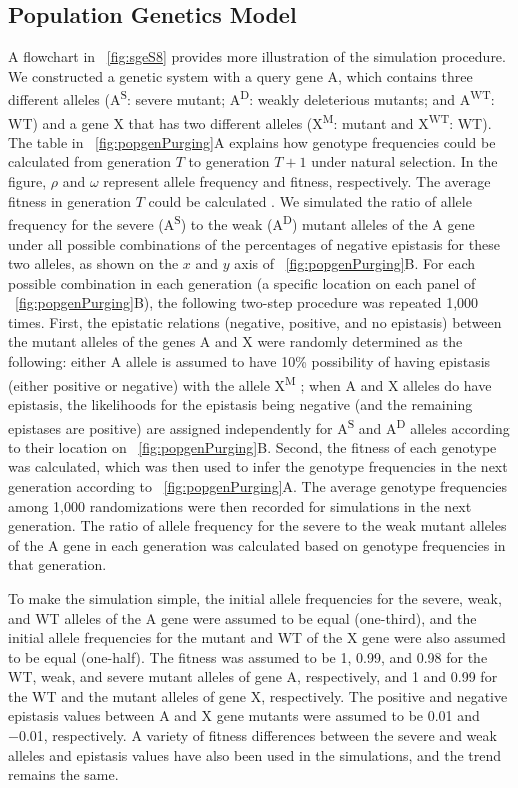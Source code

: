 \subsection{Population Genetics Model} A flowchart in
\Fig~\ref{fig:sgeS8} provides more illustration of the simulation
procedure. We constructed a
genetic system with a query gene A, which contains three different
alleles (A\textsuperscript{S}: severe mutant; A\textsuperscript{D}:
weakly deleterious mutants; and A\textsuperscript{WT}: WT) and a gene
X that has two different alleles (X\textsuperscript{M}: mutant and
X\textsuperscript{WT}: WT). The table in \Fig~\ref{fig:popgenPurging}A
explains how genotype
frequencies could be calculated from generation $T$ to generation
$T+1$ under natural selection. In the figure, $\rho$ and $\omega$
represent allele frequency and fitness, respectively. The average
fitness in generation $T$ could be calculated \citep{Hartl2007}.  We
simulated the ratio of allele frequency for the severe
(A\textsuperscript{S}) to the weak (A\textsuperscript{D}) mutant
alleles of the A gene under all possible combinations of the
percentages of negative epistasis for these two alleles, as shown on
the $x$ and $y$ axis of \Fig~\ref{fig:popgenPurging}B. For each
possible combination in each generation (a specific location on each
panel of \Fig~\ref{fig:popgenPurging}B), the following two-step
procedure was repeated 1,000
times. First, the epistatic relations (negative, positive, and no
epistasis) between the mutant alleles of the genes A and X were
randomly determined as the following: either A allele is assumed to
have 10\% possibility of having epistasis (either positive or
negative) with the allele X\textsuperscript{M} \citep{Costanzo2010}; when A and X
alleles do have epistasis, the likelihoods for the epistasis being
negative (and the remaining epistases are positive) are assigned
independently for A\textsuperscript{S} and A\textsuperscript{D}
alleles according to their location on
\Fig~\ref{fig:popgenPurging}B. Second, the fitness of each genotype
was calculated, which was then used to infer the genotype frequencies
in the next generation according to \Fig~\ref{fig:popgenPurging}A. The
average genotype frequencies among 1,000 randomizations
were then recorded for simulations in the next generation. The ratio
of allele frequency for the severe to the weak mutant alleles of the A
gene in each generation was calculated based on genotype frequencies
in that generation.

To make the simulation simple, the initial allele frequencies for the
severe, weak, and WT alleles of the A gene were assumed to be equal
(one-third), and the initial allele frequencies for the mutant and WT
of the X gene were also assumed to be equal (one-half). The fitness
was assumed to be 1, 0.99, and 0.98 for the WT, weak, and severe
mutant alleles of gene A, respectively, and 1 and 0.99 for the WT and
the mutant alleles of gene X, respectively. The positive and negative
epistasis values between A and X gene mutants were assumed to be 0.01
and −0.01, respectively. A variety of fitness differences between the
severe and weak alleles and epistasis values have also been used in
the simulations, and the trend remains the same.

